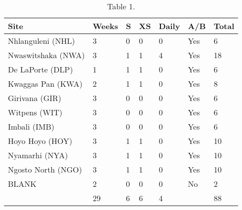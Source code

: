 \begin{table}[h!]
\centering
\begin{tabular}{llllll|l}
  \hline
  \hline
  Site & Weeks & S & XS & Daily & A/B & Total\\
  \hline
  Nhlanguleni (NHL) 	& 3 & 0 & 0 & 0 & Yes & 6 \\
  Nwaswitshaka (NWA) 	& 3 & 1 & 1 & 4 & Yes & 18 \\
  De LaPorte (DLP) 		& 1 & 1 & 1 & 0 & Yes & 6 \\
  Kwaggas Pan (KWA) 	& 2 & 1 & 1 & 0 & Yes & 8\\
  Girivana (GIR) 		& 3 & 0 & 0 & 0 & Yes & 6 \\
  Witpens (WIT) 		& 3 & 0 & 0 & 0 & Yes & 6 \\
  Imbali (IMB) 			& 3 & 0 & 0 & 0 & Yes & 6 \\
  Hoyo Hoyo (HOY) 		& 3 & 1 & 1 & 0 & Yes & 10 \\
  Nyamarhi (NYA) 		& 3 & 1 & 1 & 0 & Yes & 10 \\
  Ngosto North (NGO) 	& 3 & 1 & 1 & 0 & Yes &10 \\
  BLANK 				& 2 & 0 & 0 & 0 & No & 2 \\
  \hline
   						& 29 & 6 & 6 & 4 & & 88 \\
  \hline
  \hline
\end{tabular}
\caption{Table 1.}
\label{tab:samples}
\end{table}
